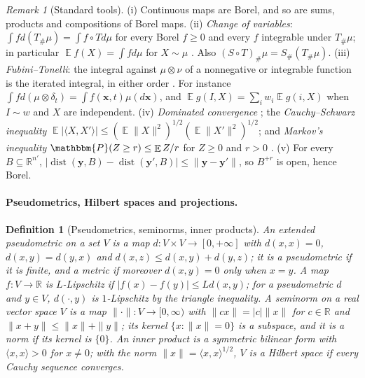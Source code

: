 \documentclass{article}
\DeclareMathOperator{\E}{\mathbb{E}}
\DeclareMathOperator{\dist}{dist}
\newcommand{\RR}{\mathbb{R}}
\newcommand{\PP}{\mathbbm{P}}
\newcommand{\bx}{\mathbf{x}}
\newcommand{\by}{\mathbf{y}}
\theoremstyle{plain}
\newtheorem{definition}[theorem]{Definition}
\theoremstyle{remark}
\newtheorem{remark}[theorem]{Remark}
\begin{document}
\begin{remark}[Standard tools]\label{rem:tools}
(i) Continuous maps are Borel, and so are sums, products and compositions of Borel maps.
(ii) \emph{Change of variables}: $\int fd(T_\#\mu)=\int f\circ Td\mu$ for every Borel $f\ge0$ and every $f$ integrable under $T_\#\mu$; in
particular $\E f(X)=\int fd\mu$ for $X\sim\mu$ \citep[Sec.~6.12]{williams1991probability}. Also $(S\circ T)_\#\mu=S_\#(T_\#\mu)$.
(iii) \emph{Fubini--Tonelli}: the integral against $\mu\otimes\nu$ of a nonnegative or integrable function is the iterated integral, in either
order \citep[Thms.~4.4--4.5]{brezis2011functional}. For instance $\int fd(\mu\otimes\delta_t)=\int f(\bx,t)\mu(d\bx)$, and
$\E g(I,X)=\sum_iw_i\E g(i,X)$ when $I\sim w$ and $X$ are independent.
(iv) \emph{Dominated convergence} \citep[Thm.~4.2]{brezis2011functional}; the \emph{Cauchy--Schwarz inequality}
$\E|\langle X,X'\rangle|\le(\E\|X\|^2)^{1/2}(\E\|X'\|^2)^{1/2}$; and \emph{Markov's inequality} $\PP(Z\ge r)\le\E Z/r$ for $Z\ge0$ and $r>0$
\citep[Secs.~6.4 and 6.8]{williams1991probability}.
(v) For every $B\subseteq\RR^{n'}$, $|\dist(\by,B)-\dist(\by',B)|\le\|\by-\by'\|$, so $B^{+r}$ is open, hence Borel.
\end{remark}

\paragraph{Pseudometrics, Hilbert spaces and projections.}

\begin{definition}[Pseudometrics, seminorms, inner products]\label{def:metric_spaces}
An \emph{extended pseudometric} on a set $V$ is a map $d:V\times V\to[0,+\infty]$ with $d(x,x)=0$, $d(x,y)=d(y,x)$ and $d(x,z)\le d(x,y)+d(y,z)$;
it is a \emph{pseudometric} if it is finite, and a \emph{metric} if moreover $d(x,y)=0$ only when $x=y$. A map $f:V\to\RR$ is
\emph{$L$-Lipschitz} if $|f(x)-f(y)|\le Ld(x,y)$; for a pseudometric $d$ and $y\in V$, $d(\cdot,y)$ is $1$-Lipschitz by the triangle inequality.
A \emph{seminorm} on a real vector space $V$ is a map $\|\cdot\|:V\to[0,\infty)$ with $\|cx\|=|c|\|x\|$ for $c\in\RR$ and $\|x+y\|\le\|x\|+\|y\|$; its
\emph{kernel} $\{x:\|x\|=0\}$ is a subspace, and it is a \emph{norm} if its kernel is $\{0\}$. An \emph{inner product} is a symmetric bilinear
form with $\langle x,x\rangle>0$ for $x\ne0$; with the norm $\|x\|=\langle x,x\rangle^{1/2}$, $V$ is a \emph{Hilbert space} if every Cauchy sequence
converges.
\end{definition}
\end{document}
